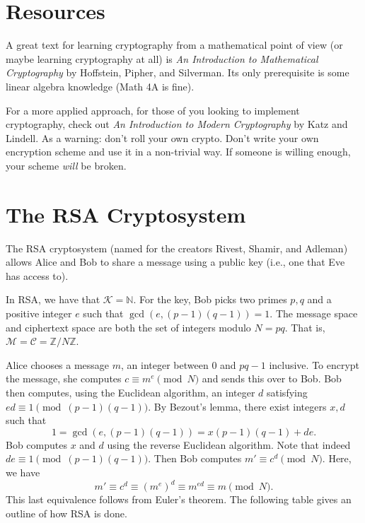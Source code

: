\documentclass{article}
\theoremstyle{definition}
\theoremstyle{remark}
\newcommand{\NN}{\mathbb{N}}
\newcommand{\ZZ}{\mathbb{Z}}
\begin{document}
\section{Resources}

    A great text for learning cryptography from a mathematical point of view (or maybe learning cryptography at all) is \textit{An Introduction to Mathematical Cryptography} by Hoffstein, Pipher, and Silverman.
    Its only prerequisite is some linear algebra knowledge (Math 4A is fine).
    
    For a more applied approach, for those of you looking to implement cryptography, check out \textit{An Introduction to Modern Cryptography} by Katz and Lindell.
    As a warning: don't roll your own crypto.
    Don't write your own encryption scheme and use it in a non-trivial way.
    If someone is willing enough, your scheme \textit{will} be broken.

\section{The RSA Cryptosystem}

    The RSA cryptosystem (named for the creators Rivest, Shamir, and Adleman) allows Alice and Bob to share a message using a public key (i.e., one that Eve has access to).

    In RSA, we have that \(\mathcal{K}=\NN\).
    For the key, Bob picks two primes \(p,q\) and a positive integer \(e\) such that \(\gcd(e,(p-1)(q-1))=1\).
    The message space and ciphertext space are both the set of integers modulo \(N=pq\).
    That is, \(\mathcal{M}=\mathcal{C}=\ZZ/N\ZZ\).

    Alice chooses a message \(m\), an integer between 0 and \(pq-1\) inclusive.
    To encrypt the message, she computes \(c\equiv m^e\pmod{N}\) and sends this over to Bob.
    Bob then computes, using the Euclidean algorithm, an integer \(d\) satisfying \(ed\equiv 1\pmod{(p-1)(q-1)}\).
    By Bezout's lemma, there exist integers \(x,d\) such that 
    \[1 = \gcd(e,(p-1)(q-1)) = x(p-1)(q-1) + de.\]
    Bob computes \(x\) and \(d\) using the reverse Euclidean algorithm.
    Note that indeed \(de\equiv 1\pmod{(p-1)(q-1)}\).
    Then Bob computes \(m'\equiv c^d\pmod{N}\).
    Here, we have
    \[m' \equiv c^d \equiv \left(m^e\right)^d \equiv m^{ed} \equiv m\pmod{N}.\]
    This last equivalence follows from Euler's theorem. The following table gives an outline of how RSA is done.
\end{document}

